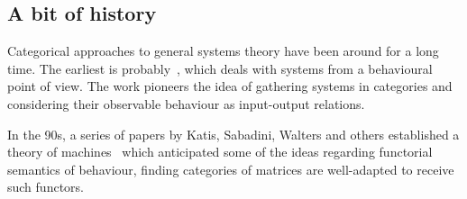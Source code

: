 

\subsection{A bit of history}
Categorical approaches to general systems theory have been around for a long time.
The earliest is probably~\cite{rosen1978fundamentals}, which deals with systems from a behavioural point of view. The work pioneers the idea of gathering systems in categories and considering their observable behaviour as input-output relations.

In the 90s, a series of papers by Katis, Sabadini, Walters and others established a theory of machines~\cite{sabadini_functions_1993, bloom_matrices_1996, katis1997bicategories, katis1997span, katis_algebra_1999, katis2002feedback} which anticipated some of the ideas regarding functorial semantics of behaviour, finding categories of matrices are well-adapted to receive such functors.

